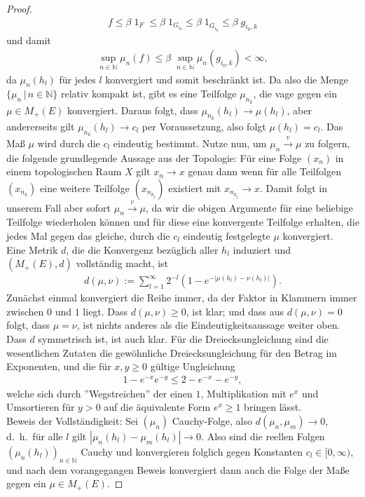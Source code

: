 \documentclass[twoside]{article}
\theoremstyle{definition}
\begin{document}
\begin{proof}
\begin{align}
f \leq \beta \; 1_F \; \leq \beta \; 1_{G_{i_0}} \leq \beta \; 1_{\overline{G}_{i_0}} \leq \beta \; g_{i_0,k}
\end{align}
und damit
\begin{align}
\sup_{n \in \mathbb{N}} \mu_n(f) \leq \beta \; \sup_{n \in \mathbb{N}} \mu_n(g_{i_0,k}) < \infty,
\end{align}
da $\mu_n(h_l)$ für jedes $l$ konvergiert und somit beschränkt ist. Da also die Menge $\{\mu_n \, | \, n \in \mathbb{N} \}$ relativ kompakt ist, gibt es eine Teilfolge $\mu_{n_k}$, die vage gegen ein $\mu \in M_+(E)$ konvergiert. Daraus folgt, dass $\mu_{n_k}(h_l) \to \mu(h_l)$, aber andererseits gilt $\mu_{n_k}(h_l) \to c_l$ per Voraussetzung, also folgt $\mu(h_l) = c_l$. Das Maß $\mu$ wird durch die $c_l$ eindeutig bestimmt. Nutze nun, um $\mu_n \xrightarrow{v} \mu$ zu folgern, die folgende grundlegende Aussage aus der Topologie: Für eine Folge $(x_n)$ in einem topologischen Raum $X$ gilt $x_n \to x$ genau dann wenn für alle Teilfolgen $(x_{n_k})$ eine weitere Teilfolge $(x_{n_{k_j}})$ existiert mit $x_{n_{k_j}} \to x$. Damit folgt in unserem Fall aber sofort $\mu_n \xrightarrow{v} \mu$, da wir die obigen Argumente für eine beliebige Teilfolge wiederholen können und für diese eine konvergente Teilfolge erhalten, die jedes Mal gegen das gleiche, durch die $c_l$ eindeutig festgelegte $\mu$ konvergiert.\\


Eine Metrik $d$, die die Konvergenz bezüglich aller $h_l$ induziert und $(M_+(E),d)$ vollständig macht, ist
\begin{align}
d(\mu,\nu) := \sum_{l=1}^\infty 2^{-l} \left(1 - e^{- | \mu(h_l) - \nu(h_l)|} \right).
\end{align}
Zunächst einmal konvergiert die Reihe immer, da der Faktor in Klammern immer zwischen $0$ und $1$ liegt. Dass $d(\mu,\nu) \geq 0$, ist klar; und dass aus $d(\mu,\nu)=0$ folgt, dass $\mu = \nu$, ist nichts anderes als die Eindeutigkeitsaussage weiter oben. Dass $d$ symmetrisch ist, ist auch klar. Für die Dreiecksungleichung sind die wesentlichen Zutaten die gewöhnliche Dreiecksungleichung für den Betrag im Exponenten, und die für $x,y \geq 0$ gültige Ungleichung
\begin{align*}
1 - e^{-x} e^{-y} \leq 2 - e^{-x} -e^{-y},
\end{align*}
welche sich durch ''Wegstreichen'' der einen $1$, Multiplikation mit $e^x$ und Umsortieren für $y > 0$ auf die äquivalente Form $e^x \geq 1$ bringen lässt.\\
Beweis der Vollständigkeit: Sei $(\mu_n)$ Cauchy-Folge, also $d(\mu_n,\mu_m)\to 0$, d.\ h.\ für alle $l$ gilt $|\mu_n(h_l)-\mu_m(h_l)|\to 0$. Also sind die reellen Folgen $(\mu_n(h_l))_{n \in \mathbb{N}}$ Cauchy und konvergieren folglich gegen Konstanten $c_l \in [0,\infty)$, und nach dem vorangegangen Beweis konvergiert dann auch die Folge der Maße gegen ein $\mu \in M_+(E)$.
\end{proof}
\end{document}
